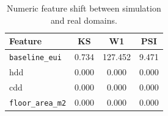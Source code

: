\begin{table}[t]
\centering
\caption{Numeric feature shift between simulation and real domains.}
\label{tab:shift_numeric}
\begin{tabular}{l S S S}
\toprule
Feature & {KS} & {W1} & {PSI} \\
\midrule
\texttt{baseline\_eui} & 0.734 & 127.452 & 9.471 \\
hdd & 0.000 & 0.000 & 0.000 \\
cdd & 0.000 & 0.000 & 0.000 \\
\texttt{floor\_area\_m2} & 0.000 & 0.000 & 0.000 \\
\bottomrule
\end{tabular}
\end{table}
